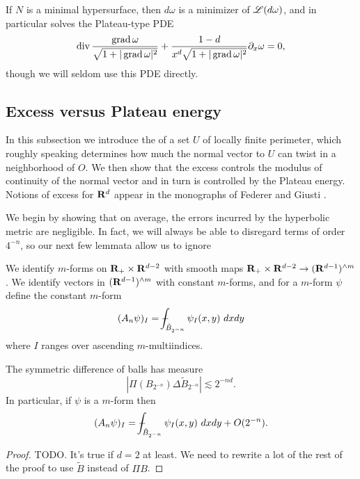 If $N$ is a minimal hypersurface, then $d\omega$ is a minimizer of $\mathscr L(d\omega)$, and in particular solves the Plateau-type PDE
\begin{equation}\label{Plateau PDE}
    \operatorname{div} \frac{\operatorname{grad} \omega}{\sqrt{1 + |\operatorname{grad} \omega|^2}} + \frac{1 - d}{x^d \sqrt{1 + |\operatorname{grad} \omega|^2}} \partial_x \omega = 0,
\end{equation}
though we will seldom use this PDE directly.


\subsection{Excess versus Plateau energy}
In this subsection we introduce the  of a set $U$ of locally finite perimeter, which roughly speaking determines how much the normal vector to $U$ can twist in a neighborhood of $O$.
We then show that the excess controls the modulus of continuity of the normal vector and in turn is controlled by the Plateau energy.
Notions of excess for $\mathbf{R}^d$ appear in the monographs of Federer \cite[\S5.3.1]{federer2014geometric} and Giusti \cite[Chapter 6]{Giusti77}.

We begin by showing that on average, the errors incurred by the hyperbolic metric are negligible.
In fact, we will always be able to disregard terms of order $4^{-n}$, so our next few lemmata allow us to ignore

\begin{notation}
We identify $m$-forms on $\mathbf{R}_+ \times \mathbf{R}^{d - 2}$ with smooth maps $\mathbf{R}_+ \times \mathbf{R}^{d - 2} \to (\mathbf{R}^{d - 1})^{\wedge m}$.
We identify vectors in $(\mathbf{R}^{d - 1})^{\wedge m}$ with constant $m$-forms, and for a $m$-form $\psi$ define the constant $m$-form
$$(A_n \psi)_I = \dashint_{\tilde B_{2^{-n}}} \psi_I(x, y) ~dxdy$$
where $I$ ranges over ascending $m$-multiindices.
\end{notation}

\begin{lemma}\label{ball difference is harmless}
The symmetric difference of balls has measure
$$|\Pi(B_{2^{-n}}) \Delta \tilde B_{2^{-n}}| \lesssim 2^{-nd}.$$
In particular, if $\psi$ is a $m$-form then
$$(A_n \psi)_I = \dashint_{\tilde B_{2^{-n}}} \psi_I(x, y) ~dxdy + O(2^{-n}).$$
\end{lemma}
\begin{proof}
TODO. It's true if $d = 2$ at least. We need to rewrite a lot of the rest of the proof to use $\tilde B$ instead of $\Pi B$.
\end{proof}

